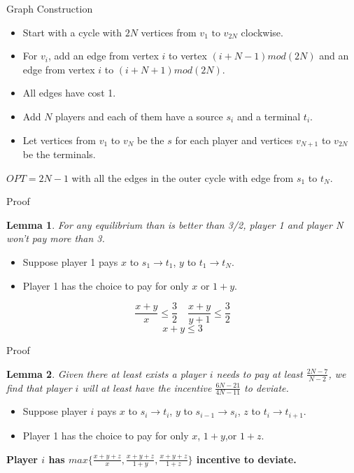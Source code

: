 \documentclass[11pt,psfig,times]{article}
\newtheorem{lemma}{Lemma}[section]
\begin{document}
	
	{Graph Construction }
	
		\begin{itemize}
			\item Start with a cycle with $2N$ vertices from $v_1 \text{ to } v_{2N}$ clockwise. 
			\item For $v_i$, add an edge from vertex $i$ to vertex $(i+N-1)mod (2N)$ and an edge from vertex $i$ to $(i+N+1)mod (2N)$.
			\item All edges have cost 1. 
			\item Add $N$ players and each of them have a source $s_i$ and a terminal $t_i$. 
			\item Let vertices from $v_1$ to $v_N$ be the $s$ for each player and vertices $v_{N+1}$ to $v_{2N}$ be the terminals.
		\end{itemize}
		$OPT = 2N-1$ with all the edges in the outer cycle with edge from $s_1$ to $t_N$. 
	
	
	{Proof}
	   
		\begin{lemma}
			For any equilibrium than is better than 3/2, player 1 and player N won't pay more than 3. 
		\end{lemma}
		\begin{itemize}
			\item Suppose player 1 pays $x$ to $s_1 \rightarrow t_1$, $y$ to $t_1 \rightarrow t_N$. 
			\item Player 1 has the choice to pay for only $x$ or $1+y$. 
		\end{itemize}
		
		\[\frac{x+y}{x} \leq \frac{3}{2}\quad\frac{x+y}{y+1} \leq \frac{3}{2}\]
		 \[x+y\leq 3\]    
	
	
	{Proof}
		\begin{lemma}
			Given there at least exists a player $i$ needs to pay at least $\frac{2N-7}{N-2}$, we find that player $i$ will at least have the incentive $\frac{6N-21}{4N-11}$ to deviate.
		\end{lemma}
		\begin{itemize}
			\item Suppose player $i$ pays $x$ to $s_i \rightarrow t_i$, $y$ to $s_{i-1} \rightarrow s_i$, $z$ to $t_i \rightarrow t_{i+1}$. 
			\item Player 1 has the choice to pay for only $x$, $1+y$,or $1+z$. 
		\end{itemize}
		
		\textbf{ Player $i$ has $max\{\frac{x+y+z}{x},\frac{x+y+z}{1+y},\frac{x+y+z}{1+z}\}$ incentive to deviate. }
	
\end{document}
